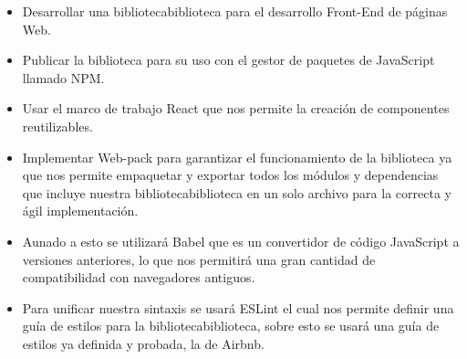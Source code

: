   \begin{itemize}
 \item Desarrollar una bibliotecabiblioteca para el desarrollo Front-End de páginas Web.
 \item Publicar la biblioteca para su uso con el gestor de paquetes de JavaScript \cite{javascript} llamado NPM.
 \item Usar el marco de trabajo React que nos permite la creación de componentes reutilizables.
 \item Implementar Web-pack para garantizar el funcionamiento de la biblioteca ya que nos permite empaquetar y exportar todos los módulos y dependencias que incluye nuestra bibliotecabiblioteca en un solo archivo para la correcta y ágil implementación. 
 \item Aunado a esto se utilizará Babel \cite{babel} que es un convertidor de código JavaScript a versiones anteriores, lo que nos permitirá una gran cantidad de compatibilidad con navegadores antiguos. 
 \item Para unificar nuestra sintaxis se usará ESLint el cual nos permite definir una guía de estilos para la bibliotecabiblioteca, sobre esto se usará una guía de estilos ya definida y probada, la de Airbnb. 
   \end{itemize}
\newpage
